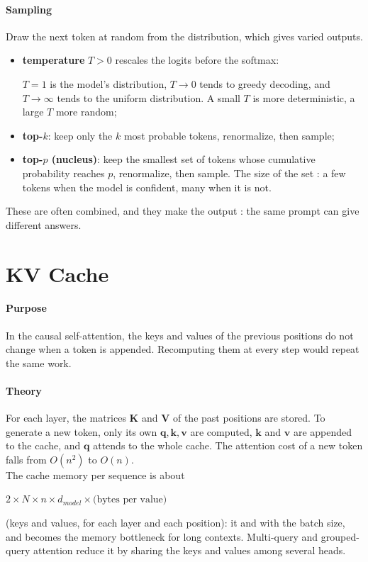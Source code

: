 \paragraph{Sampling}
Draw the next token at random from the distribution, which gives varied outputs.
\begin{itemize}
    \item \textbf{temperature} $T>0$ rescales the logits before the softmax:
        \begin{center}
        \end{center}
        $T=1$ is the model's distribution, $T\to0$ tends to greedy decoding, and
        $T\to\infty$ tends to the uniform distribution. A small $T$ is more deterministic,
        a large $T$ more random;
    \item \textbf{top-$k$}: keep only the $k$ most probable tokens, renormalize, then sample;
    \item \textbf{top-$p$ (nucleus)}: keep the smallest set of tokens whose cumulative
        probability reaches $p$, renormalize, then sample. The size of the set
        : a few tokens when the model is confident, many when it is not.
\end{itemize}
These are often combined, and they make the output : the same prompt
can give different answers.

\section{KV Cache}
\paragraph{Purpose}
In the causal self-attention, the keys and values of the previous positions do not change
when a token is appended. Recomputing them at every step would repeat the same work.

\paragraph{Theory}
For each layer, the matrices $\bm{K}$ and $\bm{V}$ of the past positions are stored.
To generate a new token, only its own $\bm{q},\bm{k},\bm{v}$ are computed, $\bm{k}$ and
$\bm{v}$ are appended to the cache, and $\bm{q}$ attends to the whole cache. The attention
cost of a new token falls from $O(n^{2})$ to $O(n)$.\\
The cache memory per sequence is about
\begin{center}
    $2\times N\times n\times d_{model}\times\text{(bytes per value)}$
\end{center}
(keys and values, for each layer and each position): it  and with the batch size, and becomes the memory bottleneck for long contexts.
Multi-query and grouped-query attention reduce it by sharing the keys and values among
several heads.

